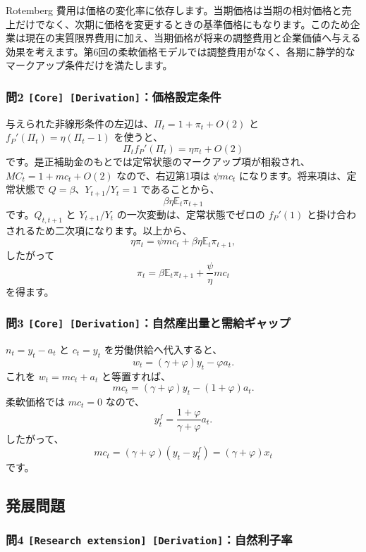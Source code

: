 \documentclass[
  japanese,
  lualatex,
  ja=standard,
  11pt,
  a4paper]{ltjsarticle}
\begin{document}
Rotemberg
費用は価格の変化率に依存します。当期価格は当期の相対価格と売上だけでなく、次期に価格を変更するときの基準価格にもなります。このため企業は現在の実質限界費用に加え、当期価格が将来の調整費用と企業価値へ与える効果を考えます。第6回の柔軟価格モデルでは調整費用がなく、各期に静学的なマークアップ条件だけを満たします。

\subsubsection{\texorpdfstring{問2
\texttt{{[}Core{]}\ {[}Derivation{]}}：価格設定条件}{問2 {[}Core{]} {[}Derivation{]}：価格設定条件}}\label{ux554f2-core-derivationux4fa1ux683cux8a2dux5b9aux6761ux4ef6}

与えられた非線形条件の左辺は、\(\Pi_t=1+\pi_t+O(2)\) と
\(f_P'(\Pi_t)=\eta(\Pi_t-1)\) を使うと、 \[
\Pi_tf_P'(\Pi_t)=\eta\pi_t+O(2)
\]
です。是正補助金のもとでは定常状態のマークアップ項が相殺され、\(MC_t=1+mc_t+O(2)\)
なので、右辺第1項は \(\psi mc_t\) になります。将来項は、定常状態で
\(Q=\beta\)、\(Y_{t+1}/Y_t=1\) であることから、 \[
\beta\eta\mathbb E_t\pi_{t+1}
\] です。\(Q_{t,t+1}\) と \(Y_{t+1}/Y_t\) の一次変動は、定常状態でゼロの
\(f_P'(1)\) と掛け合わされるため二次項になります。以上から、 \[
\eta\pi_t
=\psi mc_t+\beta\eta\mathbb E_t\pi_{t+1},
\] したがって \[
\pi_t=\beta\mathbb E_t\pi_{t+1}+\frac{\psi}{\eta}mc_t
\] を得ます。

\subsubsection{\texorpdfstring{問3
\texttt{{[}Core{]}\ {[}Derivation{]}}：自然産出量と需給ギャップ}{問3 {[}Core{]} {[}Derivation{]}：自然産出量と需給ギャップ}}\label{ux554f3-core-derivationux81eaux7136ux7523ux51faux91cfux3068ux9700ux7d66ux30aeux30e3ux30c3ux30d7}

\(n_t=y_t-a_t\) と \(c_t=y_t\) を労働供給へ代入すると、 \[
w_t=(\gamma+\varphi)y_t-\varphi a_t.
\] これを \(w_t=mc_t+a_t\) と等置すれば、 \[
mc_t=(\gamma+\varphi)y_t-(1+\varphi)a_t.
\] 柔軟価格では \(mc_t=0\) なので、 \[
y_t^f=\frac{1+\varphi}{\gamma+\varphi}a_t.
\] したがって、 \[
mc_t=(\gamma+\varphi)(y_t-y_t^f)
=(\gamma+\varphi)x_t
\] です。

\subsection{発展問題}\label{ux767aux5c55ux554fux984c-6}

\subsubsection{\texorpdfstring{問4
\texttt{{[}Research\ extension{]}\ {[}Derivation{]}}：自然利子率}{問4 {[}Research extension{]} {[}Derivation{]}：自然利子率}}\label{ux554f4-research-extension-derivationux81eaux7136ux5229ux5b50ux7387}
\end{document}
